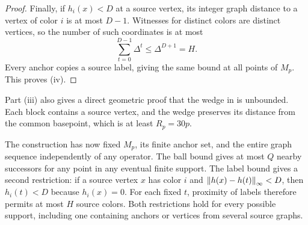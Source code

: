 \begin{proof}
Finally, if $h_i(x)<D$ at a source vertex, its integer graph distance to a
vertex of color $i$ is at most $D-1$. Witnesses for distinct colors are
distinct vertices, so the number of such coordinates is at most
\[
 \sum_{t=0}^{D-1}\Delta^t\le\Delta^{D+1}=H.
\]
Every anchor copies a source label, giving the same bound at all points of
$M_p$. This proves (iv).
\end{proof}

Part (iii) also gives a direct geometric proof that the wedge in
 is unbounded. Each block contains a source vertex,
and the wedge preserves its distance from the common basepoint, which is
at least $R_p=30p$.

The construction has now fixed $M_p$, its finite anchor set, and the entire
graph sequence independently of any operator. The ball bound gives at most
$Q$ nearby successors for any point in any eventual finite support. The
label bound gives a second restriction: if a source vertex $x$ has color
$i$ and $\left\|h(x)-h(t)\right\|_\infty<D$, then $h_i(t)<D$ because $h_i(x)=0$.
For each fixed $t$, proximity of labels therefore permits at most $H$
source colors. Both restrictions hold for every possible support, including
one containing anchors or vertices from several source graphs.
